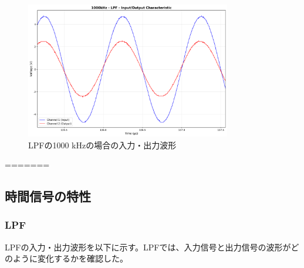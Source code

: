 \documentclass[11pt,dvipdfmx]{jarticle}
\begin{document}
\begin{figure}[H]
  \centering
  \includegraphics[width=0.8\textwidth]{graphs/1000kHz_LPF_characteristic.png}
  \caption{LPFの1000 kHzの場合の入力・出力波形}
  \label{fig:LPF_1000kHz}
\end{figure}







=======
\subsection{時間信号の特性}
\subsubsection{LPF}
LPFの入力・出力波形を以下に示す。LPFでは、入力信号と出力信号の波形がどのように変化するかを確認した。
\end{document}
